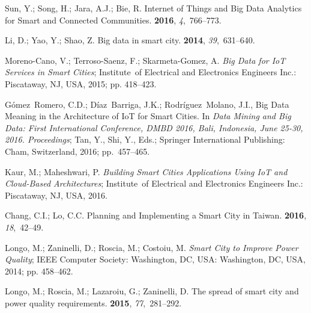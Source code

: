 \documentclass[symmetry,article,accept,moreauthors,pdftex10pt,a4paper]{mdpi}
\begin{document}
\begin{thebibliography}{999}
Sun, Y.; Song, H.; Jara, A.J.; Bie, R.
\newblock Internet of Things and Big Data Analytics for Smart and Connected
Communities.
 {\bf 2016}, {\em 4},~766--773.

Li, D.; Yao, Y.; Shao, Z.
\newblock Big data in smart city.
 {\bf 2014}, {\em 39},~631--640.

Moreno-Cano, V.; Terroso-Saenz, F.; Skarmeta-Gomez, A.
\newblock \emph{Big Data for IoT Services in Smart Cities};
\newblock Institute~of Electrical and Electronics Engineers Inc.: Piscataway, NJ, USA,  2015; pp.
418--423.

G{\'o}mez~Romero, C.D.; D{\'i}az~Barriga, J.K.; Rodr{\'i}guez~Molano, J.I., Big
Data Meaning in the Architecture of IoT for Smart Cities.
\newblock In {\em Data Mining and Big Data: First International Conference,
	DMBD 2016, Bali, Indonesia, June 25-30, 2016. Proceedings}; Tan, Y., Shi, Y.,
Eds.; Springer International Publishing: Cham, Switzerland, 2016; pp.~457--465.

Kaur, M.; Maheshwari, P.
\newblock \emph{Building Smart Cities Applications Using IoT and Cloud-Based
	Architectures};
\newblock Institute~of Electrical and Electronics Engineers Inc.: Piscataway, NJ, USA, 2016.

Chang, C.I.; Lo, C.C.
\newblock Planning and Implementing a Smart City in Taiwan.
 {\bf 2016}, {\em 18},~42--49.

Longo, M.; Zaninelli, D.; Roscia, M.; Costoiu, M.
\newblock \emph{Smart City to Improve Power Quality};
\newblock IEEE Computer Society: Washington, DC, USA: Washington, DC, USA, 2014; pp. 458--462.

Longo, M.; Roscia, M.; Lazaroiu, G.; Zaninelli, D.
\newblock The spread of smart city and power quality requirements.
 {\bf 2015}, {\em 77},~281--292.


\end{thebibliography}
\end{document}
